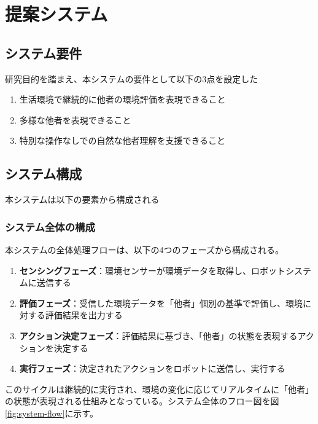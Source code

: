 \documentclass{cuxarticle}
\begin{document}
\chapter{提案システム}

\section{システム要件}
研究目的を踏まえ、本システムの要件として以下の3点を設定した

\begin{enumerate}
  \item 生活環境で継続的に他者の環境評価を表現できること
  \item 多様な他者を表現できること
  \item 特別な操作なしでの自然な他者理解を支援できること
\end{enumerate}

\section{システム構成}
本システムは以下の要素から構成される

\subsection{システム全体の構成}
本システムの全体処理フローは、以下の4つのフェーズから構成される。

\begin{enumerate}
  \item \textbf{センシングフェーズ}：環境センサーが環境データを取得し、ロボットシステムに送信する
  \item \textbf{評価フェーズ}：受信した環境データを「他者」個別の基準で評価し、環境に対する評価結果を出力する
  \item \textbf{アクション決定フェーズ}：評価結果に基づき、「他者」の状態を表現するアクションを決定する
  \item \textbf{実行フェーズ}：決定されたアクションをロボットに送信し、実行する
\end{enumerate}

このサイクルは継続的に実行され、環境の変化に応じてリアルタイムに「他者」の状態が表現される仕組みとなっている。システム全体のフロー図を図\ref{fig:system-flow}に示す。
\end{document}
